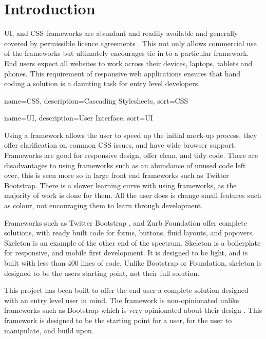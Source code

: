 \newpage
\chapter*{Introduction}

%
%

\gls{UI}, and \gls{CSS} frameworks are abundant and readily available and generally covered by permissible licence agreements \citep{CODY16}. This not only allows commercial use of the frameworks but ultimately encourages tie in to a particular framework. End users expect all websites to work across their devices, laptops, tablets and phones. This requirement of responsive web applications ensures that hand coding a solution is a daunting task for entry level developers.




%
{
  name={CSS},
  description={Cascading Stylesheets},
  sort=CSS
}
%


%
{
  name={UI},
  description={User Interface},
  sort=UI
}
%

Using a framework allows the user to speed up the initial mock-up process, they offer clarification on common \gls{CSS} issues, and have wide browser support. Frameworks are good for responsive design, offer clean, and tidy code. There are disadvantages to using frameworks such as an abundance of unused code left over, this is seen more so in large front end frameworks such as Twitter Bootstrap. There is a slower learning curve with using frameworks, as the majority of work is done for them. All the user does is change small features such as colour, not encouraging them to learn through development.

Frameworks such as Twitter Bootstrap \citep{SASS16}, and Zurb Foundation \citep{LESS16} offer complete solutions, with ready built code for forms, buttons, fluid layouts, and popovers. Skeleton \citep{SKEL16} is an example of the other end of the spectrum. Skeleton is a boilerplate for responsive, and mobile first development. It is designed to be light, and is built with less than 400 lines of code. Unlike Bootstrap or Foundation, skeleton is designed to be the users starting point, not their full solution. 

This project has been built to offer the end user a complete solution designed with an entry level user in mind. The framework is non-opinionated unlike frameworks such as Bootstrap which is very opinionated about their design \citet{KEMH16}. This framework is designed to be the starting point for a user, for the user to manipulate, and build upon.

